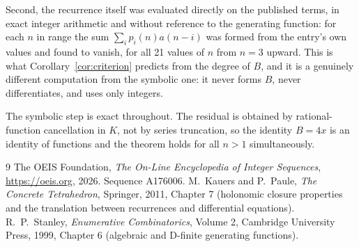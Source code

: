 \documentclass[11pt,a4paper]{article}
\theoremstyle{plain}
\theoremstyle{definition}
\begin{document}
Second, the recurrence itself was evaluated directly on the published terms, in exact
integer arithmetic and without reference to the generating function: for each $n$ in range
the sum $\sum_{i}p_{i}(n)a(n-i)$ was formed from the entry's own values and found to
vanish, for all 21 values of $n$ from $n=3$ upward. This is what
Corollary~\ref{cor:criterion} predicts from the degree of $B$, and it is a genuinely
different computation from the symbolic one: it never forms $B$, never differentiates, and
uses only integers.

The symbolic step is exact throughout. The residual is obtained by rational-function
cancellation in $K$, not by series truncation, so the identity $B=4 x$ is an
identity of functions and the theorem holds for all $n>1$ simultaneously.

\begin{thebibliography}{9}
 The OEIS Foundation, \emph{The On-Line Encyclopedia of Integer Sequences},
\url{https://oeis.org}, 2026. Sequence A176006.
 M.~Kauers and P.~Paule, \emph{The Concrete Tetrahedron}, Springer, 2011,
Chapter 7 (holonomic closure properties and the translation between recurrences and
differential equations).
 R.~P.~Stanley, \emph{Enumerative Combinatorics}, Volume 2, Cambridge
University Press, 1999, Chapter 6 (algebraic and D-finite generating functions).
\end{thebibliography}
\end{document}
